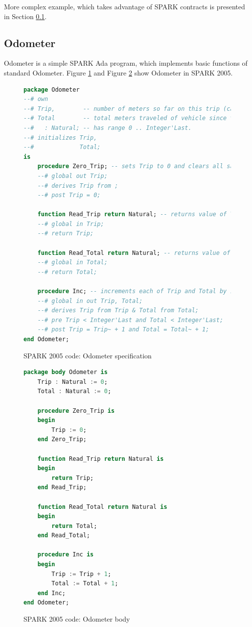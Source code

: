 More complex example, which takes advantage of SPARK contracts is presented in Section \ref{pcapumpimpl:beagleboard:odometer}.

\subsection{Odometer}
\label{pcapumpimpl:beagleboard:odometer}

Odometer is a simple SPARK Ada program, which implements basic functions of standard Odometer. Figure \ref{listing:Odometer2005_spec} and Figure \ref{listing:Odometer2005_body} show Odometer in SPARK 2005.

\begin{figure}
\singlespacing
\begin{lstlisting}[language=ada, frame=single, gobble=0]
package Odometer
--# own
--# Trip,        -- number of meters so far on this trip (can be reset to 0).
--# Total        -- total meters traveled of vehicle since the last factory-reset.
--#   : Natural; -- has range 0 .. Integer'Last.
--# initializes Trip,
--#             Total;
is
    procedure Zero_Trip; -- sets Trip to 0 and clears all saved Trip marks.
    --# global out Trip;
    --# derives Trip from ;
    --# post Trip = 0;
    
    function Read_Trip return Natural; -- returns value of Trip.
    --# global in Trip;
    --# return Trip;
    
    function Read_Total return Natural; -- returns value of Total
    --# global in Total;
    --# return Total;
    
    procedure Inc; -- increments each of Trip and Total by 1.
    --# global in out Trip, Total;
    --# derives Trip from Trip & Total from Total;
    --# pre Trip < Integer'Last and Total < Integer'Last;
    --# post Trip = Trip~ + 1 and Total = Total~ + 1;	    
end Odometer;
\end{lstlisting} 
\doublespacing
\caption{SPARK 2005 code: Odometer specification}
\label{listing:Odometer2005_spec}
\end{figure}

\begin{figure}
\singlespacing
\begin{lstlisting}[language=ada, frame=single, gobble=0]
package body Odometer is
    Trip : Natural := 0;
    Total : Natural := 0;
    
    procedure Zero_Trip is
    begin
        Trip := 0;
    end Zero_Trip;
    
    function Read_Trip return Natural is
    begin
        return Trip;
    end Read_Trip;
    
    function Read_Total return Natural is
    begin
        return Total;
    end Read_Total;
    
    procedure Inc is
    begin
        Trip := Trip + 1;
        Total := Total + 1;
    end Inc;
end Odometer;
\end{lstlisting} 
\doublespacing
\caption{SPARK 2005 code: Odometer body}
\label{listing:Odometer2005_body}
\end{figure}

